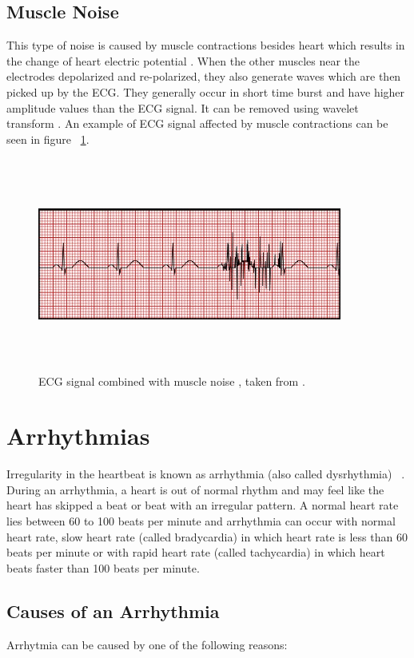 \subsection{Muscle Noise}
This type of noise is caused by muscle contractions besides heart which results in the change of heart electric potential \cite{markovski2013ict}. When the other muscles near the electrodes depolarized and re-polarized, they also generate waves which are then picked up by the ECG. They generally occur in short time burst and have higher amplitude values than the ECG signal. It can be removed using wavelet transform \cite{6091791}. An example of ECG signal affected by muscle contractions can be seen in figure ~\ref{fig:Tremor}.

\begin{figure}[htpb]
	\centering
	\includegraphics[width=10cm,height=7cm,keepaspectratio=true]{images/Tremor}
	\caption{
		ECG signal combined with muscle noise , taken from \cite{ecg_artifacts}.
	}
	\label{fig:Tremor}
\end{figure}

\section{Arrhythmias}
Irregularity in the heartbeat is known as arrhythmia (also called dysrhythmia) ~\cite{medicinenet}. During an arrhythmia, a heart is out of normal rhythm and may feel like the heart has skipped a beat or beat with an irregular pattern. A normal heart rate lies between 60 to 100 beats per minute and arrhythmia can occur with normal heart rate,  slow heart rate (called bradycardia) in which heart rate 
is less than 60 beats per minute or with rapid heart rate (called tachycardia) in which heart beats faster than 100 beats
per minute.



\subsection{Causes of an Arrhythmia}
Arrhytmia can be caused by one of the following reasons:

